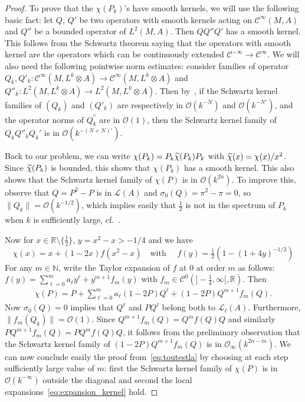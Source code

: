 \documentclass[10pt,a4paper]{article}
\theoremstyle{definition}
\numberwithin{equation}{section}
\newcommand{\R}{{\mathbb{R}}}
\newcommand{\N}{{\mathbb{N}}}
\newcommand{\si}{{\sigma}}
\newcommand{\clC}{\mathcal{C}}
\newcommand{\Ci}{{\mathcal{C}}^{\infty}}
\newcommand{\bigo}{\mathcal{O}}
\newcommand{\biginf}{\mathcal{O}_{\infty}}
\newcommand{\lag}{\mathcal{L}}
\let\oldtilde\tilde
\renewcommand*{\tilde}[1]{\mathchoice{\widetilde{#1}}{\widetilde{#1}}{\oldtilde{#1}}{\oldtilde{#1}}}
\begin{document}
\begin{proof}
To prove that the $\chi (P_k)$'s have smooth kernels, we will use the following basic fact: let $Q$, $Q'$ be two operators with smooth kernels acting on $\Ci (M,A)$ and $Q''$ be a bounded operator of $L^2(M, A)$. Then $Q Q''Q'$ has a smooth kernel. This follows from the Schwartz theorem saying that the operators with smooth kernel are the operators which can be continuously extended $\clC^{-\infty} \rightarrow \Ci $. We will also need the following pointwise norm estimates: consider families of operator $Q_k, Q'_k : \Ci (M,L^k \otimes A) \rightarrow \Ci (M, L^k\otimes A)$ and $Q''_k : L^2 (M, L^k
\otimes A) \rightarrow L^2 (M, L^k \otimes A)$. Then by~\cite[Section~4.3]{oim}, if the Schwartz kernel families of $(Q_k)$ and $(Q'_k)$ are respectively in $\bigo (k^{-N})$ and $\bigo (k^{-N'})$, and the operator norms of $Q_k^{''}$ are in $\bigo (1)$, then the Schwartz kernel family of $Q_k Q''_k Q_k'$ is in $\bigo (k^{-(N +N)'})$.

Back to our problem, we can write $\chi(P_k) = P_k \tilde{\chi} (P_k) P_k$ with $\tilde{\chi} (x) = \chi(x) / x^2$. Since $ \tilde{\chi}(P_k)$ is bounded, this shows that $\chi (P_k)$ has a smooth kernel. This also shows that the Schwartz kernel family of $\chi (P)$ is in $\bigo (k^{2n})$. To improve this, observe that $Q = P^2 - P$ is in $\lag (A)$ and $\si _0 (Q) = \pi^2 - \pi =0$, so $\| Q_k \| = \bigo (k^{-1/2})$, which implies easily that $\frac{1}{2}$ is not in the spectrum of $P_k$ when $k$ is sufficiently large, cf.~\cite[Proposition~4.2]{oim}.

Now for $x \in \R \setminus \{ \frac{1}{2}\}$, $y = x^2 -x > -1/4 $ and we have
\[
\chi (x) = x + (1-2x) f \left(x^2 -x\right) \quad \text{with } \quad f (y) = \tfrac{1}{2}
\left(1- (1+ 4y)^{-1/2}\right)
\]
 For any $m \in \N$, write the Taylor expansion of $f$ at $0$ at order $m $ as follows:  $f (y) = \sum_{\ell =0}^m a_\ell y^\ell + y^{m+1} f_m (y)$ with $f_m \in \clC^0(]-\frac{1}{4},
\infty[, \R)$. Then
\begin{gather}\label{eq:toutestla}
\chi (P) = P + \sum_{\ell = 0 }^m a_\ell (1-2P) Q^\ell + (1 - 2 P) Q^{m+1} f_m (Q).
\end{gather}
Now $\si_0(Q)=0$ implies that $Q^\ell$ and $PQ^{\ell}$ belong both to $\lag_{\ell} (A)$. Furthermore, $\|f_m(Q_k) \| = \bigo (1)$. Since $Q^{m+1} f_m (Q) = Q^m f(Q) Q$ and similarly $PQ^{m+1} f_m (Q) = PQ^m f(Q) Q$, it follows from the preliminary observation that the Schwartz kernel family of $(1 - 2 P) Q^{m+1} f_m (Q)$ is in $\biginf (k^{2n -m})$. We can now conclude easily the proof from~\eqref{eq:toutestla} by choosing at each step sufficiently large value of $m$: first the Schwartz kernel family of $\chi (P)$ is in $\bigo (k^{-\infty})$ outside the diagonal and second the local expansions~\eqref{eq:expansion_kernel} hold.
\end{proof}
\end{document}
